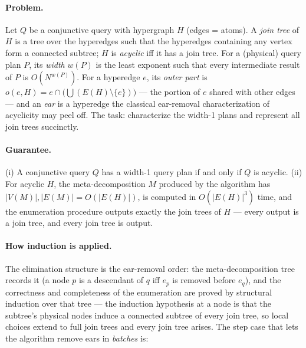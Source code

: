 \paragraph{Problem.}
Let $Q$ be a conjunctive query with hypergraph $H$ (edges = atoms). A \emph{join tree}
of $H$ is a tree over the hyperedges such that the hyperedges containing any vertex
form a connected subtree; $H$ is \emph{acyclic} iff it has a join tree. For a
(physical) query plan $P$, its \emph{width} $w(P)$ is the least exponent such that
every intermediate result of $P$ is $O(N^{w(P)})$. For a hyperedge $e$, its
\emph{outer part} is $o(e,H) = e \cap \bigl(\bigcup (E(H) \setminus \{e\})\bigr)$ ---
the portion of $e$ shared with other edges --- and an \emph{ear} is a hyperedge the
classical ear-removal characterization of acyclicity may peel off. The task:
characterize the width-1 plans and represent all join trees succinctly.

\paragraph{Guarantee.}

\begin{theorem}\label{thm:ind-succinct}
(i) A conjunctive query $Q$ has a width-1 query plan if and only if $Q$ is acyclic.
(ii) For acyclic $H$, the meta-decomposition $M$ produced by the algorithm has
$|V(M)|, |E(M)| = O(|E(H)|)$, is computed in $O(|E(H)|^{3})$ time, and the enumeration
procedure outputs exactly the join trees of $H$ --- every output is a join tree, and
every join tree is output. \eop
\end{theorem}


\paragraph{How induction is applied.}
The elimination structure is the ear-removal order: the meta-decomposition tree
records it (a node $p$ is a descendant of $q$ iff $e_p$ is removed before $e_q$), and
the correctness and completeness of the enumeration are proved by structural induction
over that tree --- the induction hypothesis at a node is that the subtree's physical
nodes induce a connected subtree of every join tree, so local choices extend to full
join trees and every join tree arises. The step case that lets the algorithm remove
ears in \emph{batches} is:

